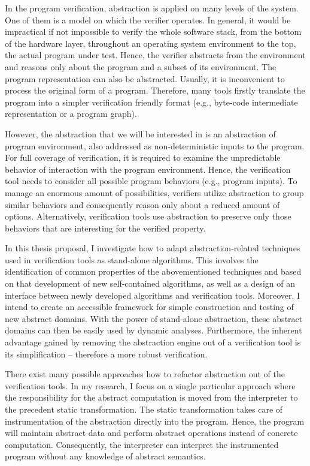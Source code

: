 In the program verification, abstraction is applied on many levels of the
system.  One of them is a model on which the verifier operates. In general, it
would be impractical if not impossible to verify the whole software stack, from
the bottom of the hardware layer, throughout an operating system environment to
the top, the actual program under test. Hence, the verifier abstracts from the
environment and reasons only about the program and a subset of its environment.
The program representation can also be abstracted.  Usually, it is inconvenient
to process the original form of a program. Therefore, many tools firstly
translate the program into a simpler verification friendly format  (e.g.,
byte-code intermediate representation or a program graph).

However, the abstraction that we will be interested in is an abstraction of
program environment, also addressed as non-deter\-mi\-ni\-stic inputs to the program.
For full coverage of verification, it is required to examine the unpredictable
behavior of interaction with the program environment. Hence, the verification
tool needs to consider all possible program behaviors (e.g., program inputs).
To manage an enormous amount of possibilities, verifiers utilize abstraction to
group similar behaviors and consequently reason only about a reduced amount of
options. Alternatively, verification tools use abstraction to preserve only
those behaviors that are interesting for the verified property.

In this thesis proposal, I investigate how to adapt abstraction-related
techniques used in verification tools as stand-alone algorithms. This involves
the identification of common properties of the abovementioned techniques and
based on that development of new self-con\-tained algorithms, as well as a
design of an interface between newly developed algorithms and verification
tools. Moreover, I intend to create an accessible framework for simple
construction and testing of new abstract domains. With the power of stand-alone
abstraction, these abstract domains can then be easily used by dynamic
analyses. Furthermore, the inherent advantage gained by removing the
abstraction engine out of a verification tool is its simplification --
therefore a more robust verification.

There exist many possible approaches how to refactor abstraction out of the
verification tools. In my research, I focus on a single particular approach
where the responsibility for the abstract computation is moved from the
interpreter to the precedent static transformation. The static transformation
takes care of instrumentation of the abstraction directly into the program.
Hence, the program will maintain abstract data and perform abstract operations
instead of concrete computation. Conse\-quen\-tly, the interpreter can interpret
the instrumented program without any knowledge of abstract semantics.

